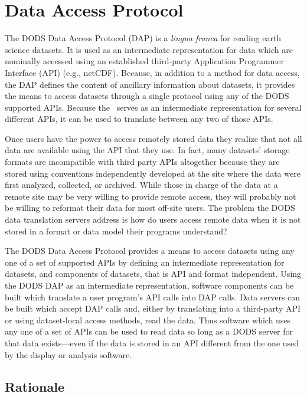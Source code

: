 \section{Data Access Protocol}
\label{dap}

The DODS Data Access Protocol (DAP) is a {\em lingua franca\/} for
reading earth science datasets. It is used as an intermediate representation
for data which are nominally accessed using an established third-party
Application Programmer Interface (API) (e.g., netCDF). Because, in addition
to a method for data access, the DAP defines the content of ancillary
information about datasets, it provides the means to access datasets
through a single protocol using any of the DODS supported APIs. Because the
\dap\ serves as an intermediate representation for several different APIs, it
can be used to translate between any two of those APIs.

Once users have the power to access remotely stored data they realize
that not all data are available using the API that they use. In fact,
many datasets' storage formats are incompatible with third party APIs
altogether because they are stored using conventions independently
developed at the site where the data were first analyzed, collected,
or archived. While those in charge of the data at a remote site may be
very willing to provide remote access, they will probably not be
willing to reformat their data for most off-site users. The problem
the DODS data translation servers address is how do users access
remote data when it is not stored in a format or data model their
programs understand?

The DODS Data Access Protocol provides a means to access datasets using any
one of a set of supported APIs by defining an intermediate representation for
datasets, and components of datasets, that is API and format independent.
Using the DODS DAP as an intermediate representation, software components can
be built which translate a user program's API calls into DAP calls. Data
servers can be built which accept DAP calls and, either by translating
into a third-party API or using dataset-local access methods, read the data.
Thus software which uses any one of a set of APIs can be used to read data so
long as a DODS server for that data exists---even if the data is stored in an
API different from the one used by the display or analysis software.

\subsection{Rationale}


